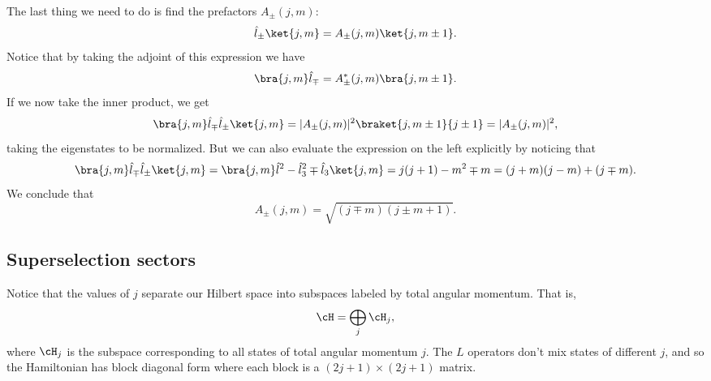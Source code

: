 The last thing we need to do is find the prefactors $A_\pm(j,m)$:
\begin{equation}
    \hat l_\pm \ket{j,m} = A_\pm(j,m) \ket{j,m\pm 1}.
\end{equation}
Notice that by taking the adjoint of this expression we have
\begin{equation}
    \bra{j,m}\hat l_\mp = A^*_\pm(j,m) \bra{j,m\pm 1}.
\end{equation}
If we now take the inner product, we get
\begin{equation}
    \bra{j,m} \hat l_\mp \hat l_\pm \ket{j,m} = |A_\pm (j,m)|^2 \braket{j,m\pm 1}{j\pm 1} = |A_\pm(j,m)|^2,
\end{equation}
taking the eigenstates to be normalized. But we can also evaluate the expression on the left explicitly by noticing that
\begin{equation}
    \bra{j,m} \hat l_\mp \hat l_\pm \ket{j,m} = \bra{j,m} \hat l^2 - \hat l_3^2 \mp \hat l_3 \ket{j,m} = j(j+1) -m^2 \mp m = (j+m)(j-m) + (j\mp m).
\end{equation}
We conclude that
\begin{equation}
    A_\pm (j,m) = \sqrt{(j\mp m)(j\pm m +1)}.
\end{equation}

\subsection*{Superselection sectors}
Notice that the values of $j$ separate our Hilbert space into subspaces labeled by total angular momentum. That is,
\begin{equation}
    \cH = \bigoplus_j \cH_j,
\end{equation}
where $\cH_j$ is the subspace corresponding to all states of total angular momentum $j$. The $L$ operators don't mix states of different $j$, and so the Hamiltonian has block diagonal form where each block is a $(2j+1)\times (2j+1)$ matrix.

